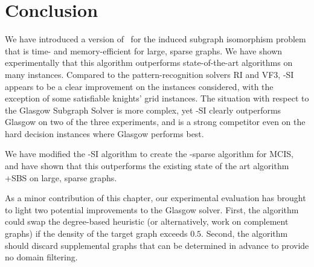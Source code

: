 \section{Conclusion}\label{sec:mcsplit-si-conclusion}

We have introduced a version of \McSplit\ for the induced subgraph isomorphism problem that is time- and memory-efficient for large, sparse graphs.
We have shown experimentally that this algorithm outperforms state-of-the-art algorithms on many instances.
Compared to the pattern-recognition solvers RI and VF3, \McSplit-SI appears to be a clear improvement
on the instances considered, with the exception of some satisfiable knights' grid instances.  The situation
with respect to the Glasgow Subgraph Solver is more complex, yet \McSplit-SI clearly outperforms Glasgow on
two of the three experiments, and is a strong competitor even on the hard decision instances
where Glasgow performs best.

We have modified the \McSplit-SI algorithm to create the \McSplit-sparse
algorithm for MCIS, and have shown that this outperforms the existing
state of the art algorithm \kDown+SBS on large, sparse graphs.

As a minor contribution of this chapter, our experimental evaluation has
brought to light two potential improvements to the Glasgow solver.  First, the
algorithm could swap the degree-based heuristic (or alternatively, work on
complement graphs) if the density of the target graph exceeds $0.5$.  Second,
the algorithm should discard supplemental graphs that can be determined in
advance to provide no domain filtering.
